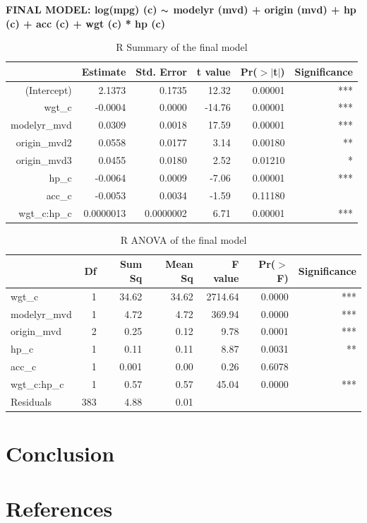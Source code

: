 \documentclass{article}
\newcommand{\mt}[1]{\ensuremath{#1}}
\newcommand{\tl}{\mt{\thicksim} }
\begin{document}
\clearpage
\newpage 

\textbf{FINAL MODEL: log(mpg) (c) \tl modelyr (mvd) + origin (mvd) + hp (c) + acc (c) + wgt (c) * hp (c)}

\begin{table}[ht]
\centering
\begin{tabular}{rrrrrr}
  \hline
 & Estimate & Std. Error & t value & Pr($>$$|$t$|$) & Significance\\ 
  \hline
(Intercept) & 2.1373 & 0.1735 & 12.32 & 0.00001 & *** \\ 
  wgt\_c & -0.0004 & 0.0000 & -14.76 & 0.00001 & *** \\ 
  modelyr\_mvd & 0.0309 & 0.0018 & 17.59 & 0.00001 & *** \\ 
  origin\_mvd2 & 0.0558 & 0.0177 & 3.14 & 0.00180 & ** \\ 
  origin\_mvd3 & 0.0455 & 0.0180 & 2.52 & 0.01210 & * \\ 
  hp\_c & -0.0064 & 0.0009 & -7.06 & 0.00001 & *** \\ 
  acc\_c & -0.0053 & 0.0034 & -1.59 & 0.11180 & \\ 
  wgt\_c:hp\_c & 0.0000013 & 0.0000002 & 6.71 & 0.00001 & *** \\ 
   \hline
\end{tabular}
\caption{R Summary of the final model}
\label{tab:summaryfinalmodel}
\end{table}

\begin{table}[ht]
\centering
\begin{tabular}{lrrrrrr}
  \hline
 & Df & Sum Sq & Mean Sq & F value & Pr($>$F) & Significance \\ 
  \hline
wgt\_c & 1 & 34.62 & 34.62 & 2714.64 & 0.0000 & *** \\ 
  modelyr\_mvd & 1 & 4.72 & 4.72 & 369.94 & 0.0000 & *** \\ 
  origin\_mvd & 2 & 0.25 & 0.12 & 9.78 & 0.0001 & *** \\ 
  hp\_c & 1 & 0.11 & 0.11 & 8.87 & 0.0031 & ** \\ 
  acc\_c & 1 & 0.001 & 0.00 & 0.26 & 0.6078 & \\ 
  wgt\_c:hp\_c & 1 & 0.57 & 0.57 & 45.04 & 0.0000 & *** \\ 
  Residuals & 383 & 4.88 & 0.01 &  &  & \\ 
   \hline
\end{tabular}
\caption{R ANOVA of the final model}
\label{tab:anovafinalmodel}
\end{table}

\section{Conclusion}

\section{References}
\end{document}
